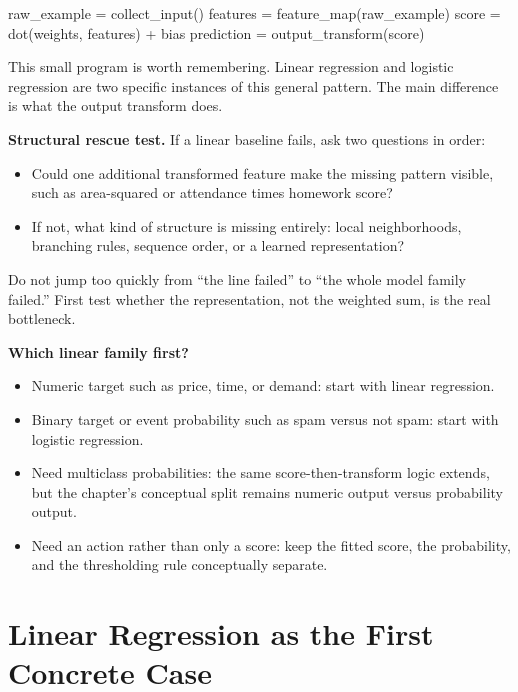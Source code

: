 \begin{codeexample}[caption={A generic feature pipeline for a linear model}]
raw_example = collect_input()
features = feature_map(raw_example)
score = dot(weights, features) + bias
prediction = output_transform(score)
\end{codeexample}

This small program is worth remembering. Linear regression and logistic regression are two specific instances of this general pattern. The main difference is what the output transform does.

\begin{thinkingtool}
\textbf{Structural rescue test.} If a linear baseline fails, ask two questions in order:
\begin{itemize}[leftmargin=*]
\item Could one additional transformed feature make the missing pattern visible, such as area-squared or attendance times homework score?
\item If not, what kind of structure is missing entirely: local neighborhoods, branching rules, sequence order, or a learned representation?
\end{itemize}
Do not jump too quickly from ``the line failed'' to ``the whole model family failed.'' First test whether the representation, not the weighted sum, is the real bottleneck.
\end{thinkingtool}

\begin{decisionbox}
\textbf{Which linear family first?}
\begin{itemize}[leftmargin=*]
\item Numeric target such as price, time, or demand: start with linear regression.
\item Binary target or event probability such as spam versus not spam: start with logistic regression.
\item Need multiclass probabilities: the same score-then-transform logic extends, but the chapter's conceptual split remains numeric output versus probability output.
\item Need an action rather than only a score: keep the fitted score, the probability, and the thresholding rule conceptually separate.
\end{itemize}
\end{decisionbox}

\section{Linear Regression as the First Concrete Case}

